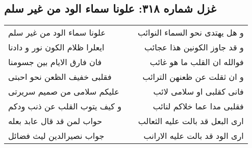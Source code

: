 \begin{center}
\section*{غزل شماره ۳۱۸: علونا سماء الود من غیر سلم}
\label{sec:0318}
\begin{longtable}{l p{0.5cm} r}
علونا سماء الود من غیر سلم
&&
و هل یهتدی نحو السماء النوائب
\\
ایعلرا ظلام الکون نور و دادنا
&&
و قد جاوز الکونین هذا عجائب
\\
فان فارق الایام بین جسومنا
&&
فوالله ان القلب ما هو غائب
\\
فقلبی خفیف الظعن نحو احبتی
&&
و ان ثقلت عن ظعنهن الترائب
\\
علیکم سلامی من صمیم سریرتی
&&
فانی کقلبی او سلامی لائب
\\
و کیف یتوب القلب عن ذنب ودکم
&&
فقلبی مدا عما خلاکم لنائب
\\
حواب لمن قد قال عابد بعله
&&
اری البعل قد بالت علیه الثعالب
\\
جواب نصیرالدین لیث فضائل
&&
اری الود قد بالت علیه الارانب
\\
\end{longtable}
\end{center}
